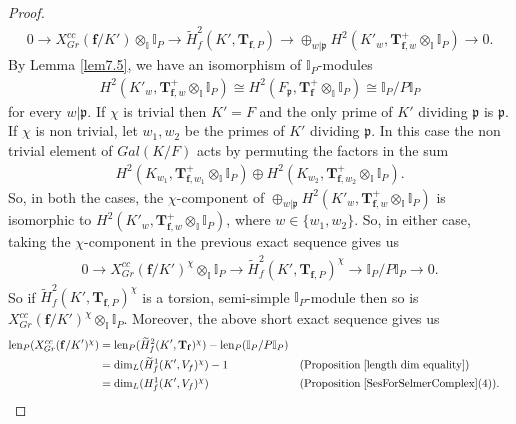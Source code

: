\documentclass[reqno,10pt]{amsart}
\newcommand{\I}{\mathbb{I}}
\newcommand{\f}{\mathbf{f}}
\newcommand{\T}{\mathbf{T}}
\newcommand{\p}{\mathfrak{p}}
\theoremstyle{plain}
\theoremstyle{definition}
\begin{document}
\begin{proof}
    \begin{align*}
        0 \rightarrow X^{cc}_{Gr}(\f/K') \otimes_\I \I_P \rightarrow \widetilde{H}^2_f(K',\T_{\f,P}) \rightarrow \oplus_{w|\p} H^2(K'_w,\T_{\f,w}^+ \otimes_\I \I_P) \rightarrow 0.
    \end{align*}
     By Lemma \ref{lem7.5}, we have an isomorphism of $\I_P$-modules
    \begin{align*}
       H^2(K'_w,\T_{\f,w}^+ \otimes_\I \I_P) \cong H^2(F_\p,\T_\f^+ \otimes_\I \I_P) \cong \I_P/P\I_P
    \end{align*}
    for every $w|\p$. If $\chi$ is trivial then $K'=F$ and the only prime of $K'$ dividing $\p$ is $\p$. If $\chi$ is non trivial, let $w_1,w_2$ be the primes of $K'$ dividing $\p$. In this case the non trivial element of $Gal(K/F)$ acts by permuting the factors in the sum
    \begin{align*}
        H^2(K_{w_1},\T_{\f,{w_1}}^+ \otimes_\I \I_P) \oplus  H^2(K_{w_2},\T_{\f,{w_2}}^+ \otimes_\I \I_P).
    \end{align*}
    So, in both the cases, the $\chi$-component of $\oplus_{w|\p} H^2(K'_w,\T_{\f,w}^+ \otimes_\I \I_P)$ is isomorphic to $H^2(K'_w,\T_{\f,w}^+ \otimes_\I \I_P)$, where $w \in \{w_1,w_2\}$.
    So, in either case, taking the $\chi$-component in the previous exact sequence gives us
    \begin{align*}
         0 \rightarrow X^{cc}_{Gr}(\f/K')^\chi \otimes_\I \I_P \rightarrow \widetilde{H}^2_f(K',\T_{\f,P})^\chi \rightarrow \I_P/P\I_P \rightarrow 0.
    \end{align*}
    So if $\widetilde{H}^2_f(K',\T_{\f,P})^\chi$ is a torsion, semi-simple $\I_P$-module then so is $X^{cc}_{Gr}(\f/K')^\chi \otimes_\I \I_P$. Moreover, the above short exact sequence gives us
    \begin{align*}
        \mathrm{len}_P(X^{cc}_{Gr}(\f/K')^\chi) & = \mathrm{len}_P(\widetilde{H}^2_f(K',\T_\f)^\chi) - \mathrm{len}_P(\I_P/P\I_P) \\
        & = \mathrm{dim}_L(\widetilde{H}^1_f(K',V_f)^\chi) - 1 && (\text{Proposition} \hspace{1mm} \ref{length dim equality}) \\
        & = \mathrm{dim}_L (H^1_f(K',V_f)^\chi) && (\text{Proposition} \hspace{1mm} \ref{SesForSelmerComplex}(4)).
    \end{align*}
\end{proof}
\end{document}
